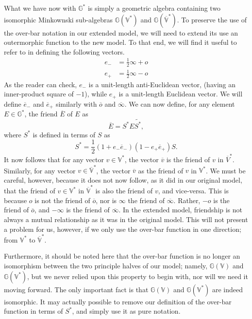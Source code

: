 \documentclass{birkjour}
\theoremstyle{definition}
\theoremstyle{remark}
\numberwithin{equation}{section}
\newcommand{\G}{\mathbb{G}}
\newcommand{\V}{\mathbb{V}}
\newcommand{\nvao}{o}
\newcommand{\nvai}{\infty}
\newcommand{\nvaob}{\overline{o}}
\newcommand{\nvaib}{\overline{\infty}}
\newcommand{\eminus}{e_{-}}
\newcommand{\eplus}{e_{+}}
\newcommand{\eminusb}{\overline{e}_{-}}
\newcommand{\eplusb}{\overline{e}_{+}}
\begin{document}
What we have now with $\G^*$ is simply a geometric algebra containing
two isomorphic Minkownski sub-algebras $\G(\V^*)$ and $\G(\overline{\V}^*)$.
To preserve the use of the over-bar notation in our extended model, we will need
to extend its use an outermorphic function to the new model.  To that end, we will
find it useful to refer to \cite{LiRockwood} in defining the following vectors.
\begin{align}
\eminus &= \frac{1}{2}\nvai + \nvao \\
\eplus &= \frac{1}{2}\nvai - \nvao
\end{align}
As the reader can check, $\eminus$ is a unit-length anti-Euclidean vector, (having an inner-product
square of $-1$), while $\eplus$ is a unit-length Euclidean vector.  We will define
$\eminusb$ and $\eplusb$ similarly with $\nvaob$ and $\nvaib$.  We can now
define, for any element $E\in\G^*$, the friend $\overline{E}$ of $E$ as
\begin{equation}
\overline{E} = S^*E\tilde{S^*},
\end{equation}
where $S^*$ is defined in terms of $S$ as
\begin{equation}
S^* = \frac{1}{2}(1+\eminus\eminusb)(1-\eplus\eplusb)S.
\end{equation}
It now follows that for any vector $v\in\V^*$, the vector $\overline{v}$ is the
friend of $v$ in $\overline{V}^*$.  Similarly, for any vector $v\in\overline{\V}^*$,
the vector $\overline{v}$ as the friend of $v$ in $\V^*$.
We must be careful, however, because it does not now follow, as it did in our
original model, that the friend of $v\in\V^*$ in $\overline{\V}^*$ is also the
friend of $v$, and vice-versa.
This is because $\nvao$ is not the friend
of $\nvaob$, nor is $\nvai$ the friend of $\nvaib$.  Rather, $-\nvao$
is the friend of $\nvaob$, and $-\nvai$ is the friend of $\nvaib$.
In the extended model, friendship is not always a mutual relationship as it
was in the original model.
This will not present a problem for us, however, if we only use the over-bar
function in one direction; from $\V^*$ to $\overline{\V}^*$.

Furthermore, it should be noted here that the over-bar function
is no longer an isomorphism between the two principle halves
of our model; namely, $\G(\V)$ and $\G(\V^*)$, but we never
relied upon this property to begin with, nor will we need it moving forward.
The only important fact is that $\G(\V)$ and $\G(\V^*)$ are indeed isomorphic.
It may actually possible to remove our definition of the over-bar function
in terms of $S^*$, and simply use it as pure notation.
\end{document}
